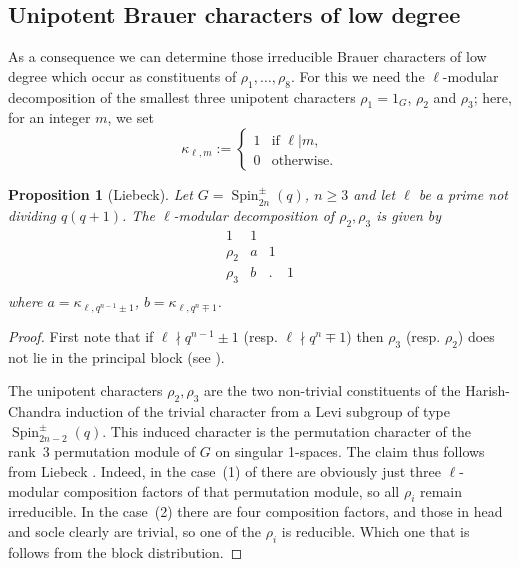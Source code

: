\documentclass[12pt,leqno,a4paper]{amsart}
\newcommand{\Spin}{{\operatorname{Spin}}}
\newtheorem{prop}[thm]{Proposition}
\theoremstyle{remark}
\begin{document}
\subsection{Unipotent Brauer characters of low degree}

As a consequence we can determine those irreducible Brauer characters of low
degree which occur as constituents of $\rho_1,\ldots,\rho_8$. For this we need
the $\ell$-modular decomposition of the smallest three unipotent characters
$\rho_1=1_G$, $\rho_2$ and $\rho_3$; here, for an integer $m$, we set
$$\kappa_{\ell,m}:= \left\{ \begin{array}{ll}
		1 & \text{if } \ell|m, \\
		0 & \text{otherwise.} \end{array} \right.$$

\begin{prop}[Liebeck]   \label{prop:decmatDn}
 Let $G=\Spin_{2n}^\pm(q)$, $n\ge3$ and let $\ell$ be a prime not dividing
 $q(q+1)$. The $\ell$-modular decomposition of $\rho_2,\rho_3$ is given by
 \[\begin{array}{l|lllll}
       1& 1\\
  \rho_2& a& 1\\
  \rho_3& b& .& 1\\
 \end{array}\]
 where $a=\kappa_{\ell,q^{n-1}\pm1}$, $b=\kappa_{\ell,q^n\mp1}$.
\end{prop}

\begin{proof}
First note that if $\ell\nmid q^{n-1}\pm1$ (resp. $\ell\nmid q^n\mp1$)
then $\rho_3$ (resp. $\rho_2$) does not lie in the principal block (see
\cite[\S 13]{FS}).

The unipotent characters $\rho_2,\rho_3$ are the two non-trivial constituents
of the Harish-Chandra induction of the trivial character from a Levi subgroup
of type $\Spin_{2n-2}^\pm(q)$. This induced character is the permutation
character of the rank~3 permutation module of $G$ on singular 1-spaces.
The claim thus follows from Liebeck \cite[Thm.~2.1 and pp.14/15]{Li86}.
Indeed, in the case~(1) of \cite[p.~10]{Li86} there are obviously just three
$\ell$-modular
composition factors of that permutation module, so all $\rho_i$ remain
irreducible. In the case~(2) there are four composition factors, and those
in head and socle clearly are trivial, so one of the $\rho_i$ is reducible.
Which one that is follows from the block distribution.
\end{proof}
\end{document}
